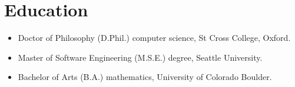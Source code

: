 \section*{Education}
\vspace{-2mm}

\begin{itemize}
    \item Doctor of Philosophy (D.Phil.) computer science, St Cross College, Oxford.\vspace{-1mm}
	\item Master of Software Engineering (M.S.E.) degree, Seattle University.\vspace{-1mm}
	\item Bachelor of Arts (B.A.) mathematics, University of Colorado Boulder.
\end{itemize}

